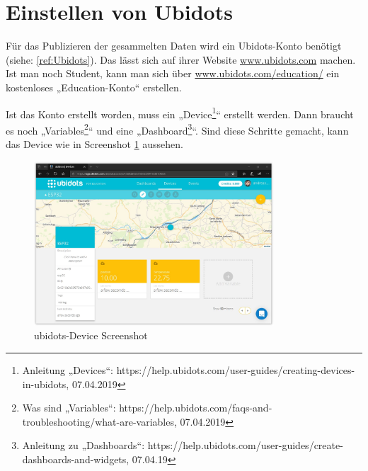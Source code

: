 \pagebreak
    
\section{Einstellen von Ubidots}
 
    Für das Publizieren der gesammelten Daten wird ein Ubidots-Konto benötigt (siehe: \ref{ref:Ubidots}). Das lässt sich auf ihrer Website \url{www.ubidots.com} machen. Ist man noch Student, kann man sich über \url{www.ubidots.com/education/} ein kostenloses „Education-Konto“ erstellen. 
    
    Ist das Konto erstellt worden, muss ein „Device\footnote{Anleitung „Devices“: https://help.ubidots.com/user-guides/creating-devices-in-ubidots, 07.04.2019}“ erstellt werden. Dann braucht es noch „Variables\footnote{Was sind „Variables“: https://help.ubidots.com/faqs-and-troubleshooting/what-are-variables, 07.04.2019}“ und eine „Dashboard\footnote{Anleitung zu „Dashboards“: https://help.ubidots.com/user-guides/create-dashboards-and-widgets, 07.04.19}“. Sind diese Schritte gemacht, kann das Device wie in Screenshot \ref{fig:ubiDev} aussehen. 
    
    \begin{figure}[H]
            \centering
            \includegraphics[width=0.8\textwidth]{./media/images/ubidotsDev.jpg}
            \caption{ubidots-Device Screenshot\cite{bib:ubidots}}
            \label{fig:ubiDev}
    \end{figure}
    
\pagebreak
    
